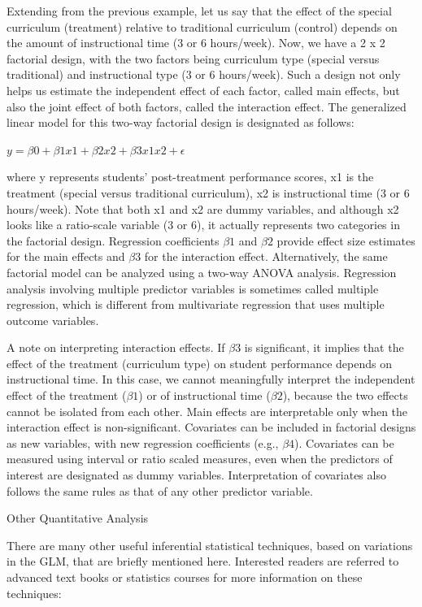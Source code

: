 Extending from the previous example, let us say that the effect of the special curriculum (treatment) relative to traditional curriculum (control) depends on the amount of instructional time (3 or 6 hours/week). Now, we have a 2 x 2 factorial design, with the two factors being curriculum type (special versus traditional) and instructional type (3 or 6 hours/week). Such a design not only helps us estimate the independent effect of each factor, called main effects, but also the joint effect of both factors, called the interaction effect. The generalized linear model for this two-way factorial design is designated as follows:

$ y = \beta0 + \beta1 x1 + \beta2 x2 + \beta3 x1 x2 + \epsilon $

where y represents students' post-treatment performance scores, x1 is the treatment (special versus traditional curriculum), x2 is instructional time (3 or 6 hours/week). Note that both x1 and x2 are dummy variables, and although x2 looks like a ratio-scale variable (3 or 6), it actually represents two categories in the factorial design. Regression coefficients $ \beta1 $ and $ \beta2 $ provide effect size estimates for the main effects and $ \beta3 $ for the interaction effect. Alternatively, the same factorial model can be analyzed using a two-way ANOVA analysis. Regression analysis involving multiple predictor variables is sometimes called multiple regression, which is different from multivariate regression that uses multiple outcome variables. 

A note on interpreting interaction effects. If $ \beta3 $ is significant, it implies that the effect of the treatment (curriculum type) on student performance depends on instructional time. In this case, we cannot meaningfully interpret the independent effect of the treatment ($ \beta1 $) or of instructional time ($ \beta2 $), because the two effects cannot be isolated from each other. Main effects are interpretable only when the interaction effect is non-significant. Covariates can be included in factorial designs as new variables, with new regression coefficients (e.g., $ \beta4 $). Covariates can be measured using interval or ratio scaled measures, even when the predictors of interest are designated as dummy variables. Interpretation of covariates also follows the same rules as that of any other predictor variable.

Other Quantitative Analysis

There are many other useful inferential statistical techniques, based on variations in the GLM, that are briefly mentioned here. Interested readers are referred to advanced text books or statistics courses for more information on these techniques:


